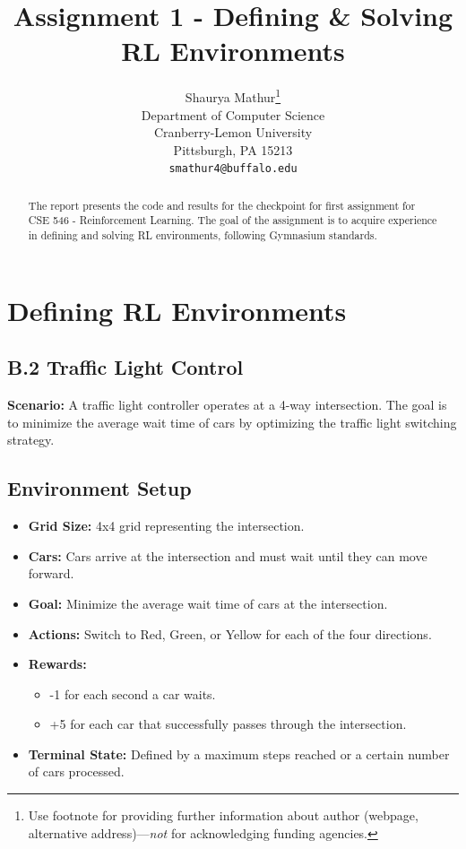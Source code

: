\documentclass{article}
\title{Assignment 1 - Defining \& Solving RL Environments}
\author{%
  Shaurya Mathur\thanks{Use footnote for providing further information
    about author (webpage, alternative address)---\emph{not} for acknowledging
    funding agencies.} \\
  Department of Computer Science\\
  Cranberry-Lemon University\\
  Pittsburgh, PA 15213 \\
  \texttt{smathur4@buffalo.edu} \\
}
\begin{document}
\maketitle

\begin{abstract}
  The report presents the code and results for the checkpoint for first assignment for CSE 546 - Reinforcement Learning. The goal of the assignment is to acquire experience in defining and solving RL environments, following
  Gymnasium standards. 
\end{abstract}

\section{Defining RL Environments}


\subsection{B.2 Traffic Light Control}
\textbf{Scenario:} A traffic light controller operates at a 4-way intersection. The goal is to minimize the average
wait time of cars by optimizing the traffic light switching strategy.


\subsection{Environment Setup}
\begin{itemize}
    \item \textbf{Grid Size:} 4x4 grid representing the intersection.
    \item \textbf{Cars:} Cars arrive at the intersection and must wait until they can move forward.
    \item \textbf{Goal:} Minimize the average wait time of cars at the intersection.
    \item \textbf{Actions:} Switch to Red, Green, or Yellow for each of the four directions.
    \item \textbf{Rewards:} 
    \begin{itemize}
        \item -1 for each second a car waits.
        \item +5 for each car that successfully passes through the intersection.
    \end{itemize}
    \item \textbf{Terminal State:} Defined by a maximum steps reached or a certain number of cars processed.
\end{itemize}
\end{document}
